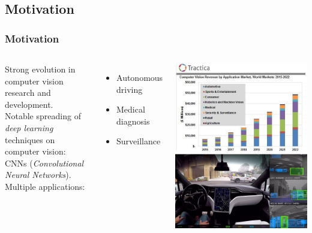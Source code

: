 \documentclass[11pt]{beamer}
\begin{document}
\subsection{Motivation}
\begin{frame}
	\frametitle{Motivation}
		\begin{columns}
			Strong evolution in computer vision research and development.\\
			\vspace{0.2cm}
			Notable spreading of \textit{deep learning} techniques on computer vision: CNNs (\textit{Convolutional Neural Networks}).\\
			\vspace{0.8cm}			
			Multiple applications:
			\begin{itemize}
				\item Autonomous driving
				\item Medical diagnosis
				\item Surveillance
			\end{itemize}
			\includegraphics[width=\linewidth]{cv_forecast_2022} \\
			\vspace{0.5cm}
			\includegraphics[width=\linewidth]{tesla_autonomous_driving}
		\end{columns}
\end{frame}
\end{document}
